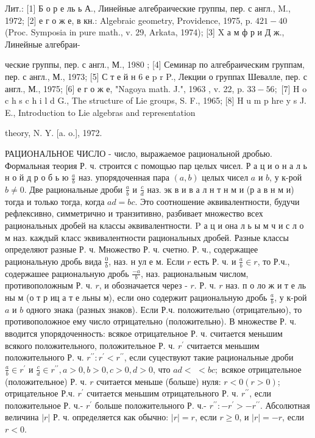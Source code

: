 \documentclass[10pt]{article}
\begin{document}
Лит.: [1] Б о р е ль ь А., Линейные алгебраические группы, пер. с англ., M., 1972; [2] е г о ж е, в кн.: Algebraic geometry, Providence, 1975, p. $421-40$ (Proc. Symposia in pure math., v. 29, Arkata, 1974); [3] X а м ф р и Д ж., Линейные алгебраи-

ческие группы, пер. с англ., М., 1980 ; [4] Семинар по алгебраическим группам, пер. с англ., М., 1973; [5] С т е й н 6 е p r P., Лекции о группах Шевалле, пер. с англ., М., 1975; [6] е г о ж е, "Nagoya math. J.", 1963 , v. 22, p. $33-56 ;$ [7] H o c h s c h i l d G., The structure of Lie groups, S. F., 1965; [8] H u m p hre y s J. E., Introduction to Lie algebras and representation

theory, N. Y. [a. o.], 1972.



РАЦИОНАЛЬНОЕ ЧИСЛО - число, выражаемое рациональной дробью. Формальная теория Р. ч. строится с помощью пар целых чисел. Р а ц и о н а л ь н о й д р о б ь ю $\frac{a}{b}$ наз. упорядоченная пара $(a, b)$ целых чисел $a$ и $b$, у к-рой $b \neq 0$. Две рациональные дроби $\frac{a}{b}$ и $\frac{c}{d}$ наз. эк в и в а л н т н м и (р а в н м и) тогда и только тогда, когда $a d=b c$. Это соотношение әквивалентности, будучи рефлексивно, симметрично и транзитивно, разбивает множество всех рациональных дробей на классы әквивалентности. $\mathrm{P}$ а ц и она л ь ы м ч и с л о м наз. каждый класс эквивалентности рациональных дробей. Разные классы определяют разные Р. ч. Множество Р. ч. счетно. Р. ч., содержащее рациональную дробь вида $\frac{0}{b}$, наз. н ул е м. Если $r$ есть Р. ч. и $\frac{a}{b} \in r$, то Р.ч., содержашее рациональную дробь $\frac{-a}{b}$, наз. рациональным числом, противоположным Р. ч. $r$, и обозначается через - $r$. Р. ч. $r$ наз. п о ло ж и т е ль ны м (о т р иц а т е льны м), если оно содержит рациональную дробь $\frac{a}{b}$, у к-рой $a$ и $b$ одного знака (разных знаков). Если Р.ч. положительно (отрицательно), то противоположное ему число отрицательно (положительно). В множестве Р. ч. вводится упорядоченность: всякое отрицательное Р. ч. считается меньшим всякого положительного, положительное Р. ч. $r^{\prime}$ считается меньшим положительного Р. ч. $r^{\prime \prime}: r^{\prime}<r^{\prime \prime}$, если суцествуют такие рациональные дроби $\frac{a}{b} \in r^{\prime}$ и $\frac{c}{d} \in r^{\prime \prime}, a>0, b>0, c>0, d>0$, что $a d<$ $<b c ;$ всякое отрицательное (положительное) Р. ч. $r$ считается меньше (больше) нуля: $r<0(r>0)$; отрицательное Р.ч. $r^{\prime}$ считается меньшим отрицательного Р. ч. $r^{\prime \prime}$, если положительное Р. ч.- $r^{\prime}$ больше положительного Р. ч.- $r^{\prime \prime}:-r^{\prime}>-r^{\prime \prime}$. Абсолютная величина $|r|$ Р. ч. определяется как обычно: $|r|=r$, если $r \geqslant 0$, и $|r|=-r$, если $r<0$.
\end{document}
